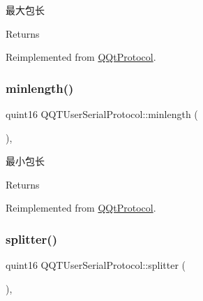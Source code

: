 最大包长 

\begin{DoxyReturn}{Returns}

\end{DoxyReturn}


Reimplemented from \mbox{\hyperlink{class_q_qt_protocol_af41bc3116abbbcfc9af45e151a253ff7}{Q\+Qt\+Protocol}}.

\mbox{\label{class_q_q_t_user_serial_protocol_a7dcd4e05381634dd45504571243ea853}} 
\subsubsection{\texorpdfstring{minlength()}{minlength()}}
{\footnotesize\ttfamily quint16 Q\+Q\+T\+User\+Serial\+Protocol\+::minlength (\begin{DoxyParamCaption}{ }\end{DoxyParamCaption})\hspace{0.3cm}{\ttfamily [override]}, {\ttfamily [virtual]}}



最小包长 

\begin{DoxyReturn}{Returns}

\end{DoxyReturn}


Reimplemented from \mbox{\hyperlink{class_q_qt_protocol_a2b00f53d3dd0eed817eeecff422891f3}{Q\+Qt\+Protocol}}.

\mbox{\label{class_q_q_t_user_serial_protocol_abcadcc53d378823ad87a0d736169fd3e}} 
\subsubsection{\texorpdfstring{splitter()}{splitter()}}
{\footnotesize\ttfamily quint16 Q\+Q\+T\+User\+Serial\+Protocol\+::splitter (\begin{DoxyParamCaption}\item[{const Q\+Byte\+Array \&}]{ }\end{DoxyParamCaption})\hspace{0.3cm}{\ttfamily [override]}, {\ttfamily [virtual]}}



